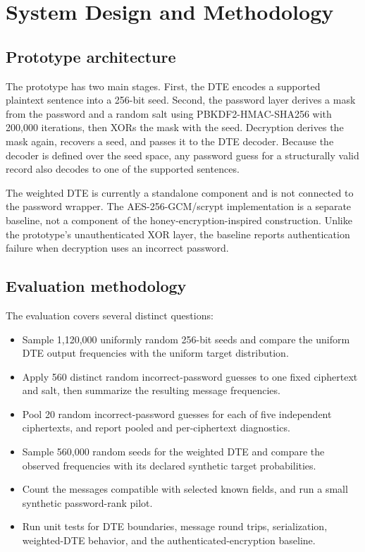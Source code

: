 \documentclass[sigconf,nonacm]{acmart}
\begin{document}
\section{System Design and Methodology}
\label{sec:design}

\subsection{Prototype architecture}

The prototype has two main stages. First, the DTE encodes a supported
plaintext sentence into a 256-bit seed. Second, the password layer derives a
mask from the password and a random salt using PBKDF2-HMAC-SHA256 with
200{,}000 iterations, then XORs the mask with the seed. Decryption derives
the mask again, recovers a seed, and passes it to the DTE decoder. Because
the decoder is defined over the seed space, any password guess for a
structurally valid record also decodes to one of the supported sentences.

The weighted DTE is currently a standalone component and is not connected to
the password wrapper. The AES-256-GCM/scrypt implementation is a separate
baseline, not a component of the honey-encryption-inspired construction.
Unlike the prototype's unauthenticated XOR layer, the baseline reports
authentication failure when decryption uses an incorrect password.

\subsection{Evaluation methodology}

The evaluation covers several distinct questions:
\begin{itemize}
  \item Sample 1{,}120{,}000 uniformly random 256-bit seeds and compare the
  uniform DTE output frequencies with the uniform target distribution.
  \item Apply 560 distinct random incorrect-password guesses to one fixed
  ciphertext and salt, then summarize the resulting message frequencies.
  \item Pool 20 random incorrect-password guesses for each of five independent
  ciphertexts, and report pooled and per-ciphertext diagnostics.
  \item Sample 560{,}000 random seeds for the weighted DTE and compare the
  observed frequencies with its declared synthetic target probabilities.
  \item Count the messages compatible with selected known fields, and run a
  small synthetic password-rank pilot.
  \item Run unit tests for DTE boundaries, message round trips, serialization,
  weighted-DTE behavior, and the authenticated-encryption baseline.
\end{itemize}
\end{document}
